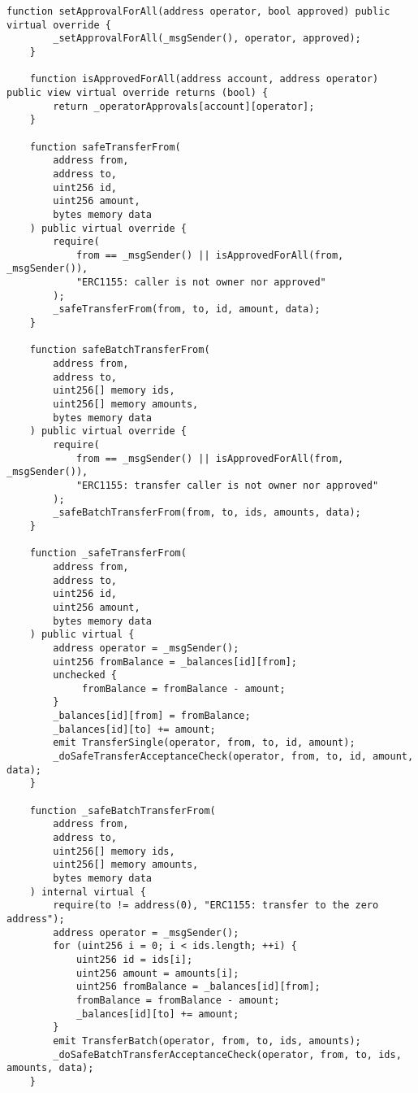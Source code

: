 \begin{lstlisting}[language=Solidity, style=solStyle]
    function setApprovalForAll(address operator, bool approved) public virtual override {
        _setApprovalForAll(_msgSender(), operator, approved);
    }

    function isApprovedForAll(address account, address operator) public view virtual override returns (bool) {
        return _operatorApprovals[account][operator];
    }

    function safeTransferFrom(
        address from,
        address to,
        uint256 id,
        uint256 amount,
        bytes memory data
    ) public virtual override {
        require(
            from == _msgSender() || isApprovedForAll(from, _msgSender()),
            "ERC1155: caller is not owner nor approved"
        );
        _safeTransferFrom(from, to, id, amount, data);
    }

    function safeBatchTransferFrom(
        address from,
        address to,
        uint256[] memory ids,
        uint256[] memory amounts,
        bytes memory data
    ) public virtual override {
        require(
            from == _msgSender() || isApprovedForAll(from, _msgSender()),
            "ERC1155: transfer caller is not owner nor approved"
        );
        _safeBatchTransferFrom(from, to, ids, amounts, data);
    }

    function _safeTransferFrom(
        address from,
        address to,
        uint256 id,
        uint256 amount,
        bytes memory data
    ) public virtual {
        address operator = _msgSender();
        uint256 fromBalance = _balances[id][from];
        unchecked {
             fromBalance = fromBalance - amount;
        }
        _balances[id][from] = fromBalance;
        _balances[id][to] += amount;
        emit TransferSingle(operator, from, to, id, amount);
        _doSafeTransferAcceptanceCheck(operator, from, to, id, amount, data);
    }

    function _safeBatchTransferFrom(
        address from,
        address to,
        uint256[] memory ids,
        uint256[] memory amounts,
        bytes memory data
    ) internal virtual {
        require(to != address(0), "ERC1155: transfer to the zero address");
        address operator = _msgSender();
        for (uint256 i = 0; i < ids.length; ++i) {
            uint256 id = ids[i];
            uint256 amount = amounts[i];
            uint256 fromBalance = _balances[id][from];
            fromBalance = fromBalance - amount;
            _balances[id][to] += amount;
        }
        emit TransferBatch(operator, from, to, ids, amounts);
        _doSafeBatchTransferAcceptanceCheck(operator, from, to, ids, amounts, data);
    }


\end{lstlisting}
